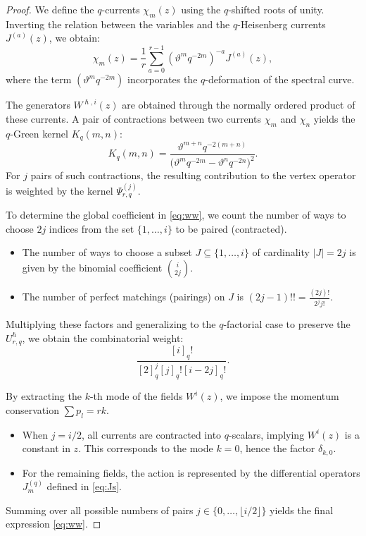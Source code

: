 \documentclass[reqno,11pt]{amsart}
\theoremstyle{plain}
\theoremstyle{definition}
\theoremstyle{remark}
\numberwithin{equation}{section}
\renewcommand{\theta}{\vartheta}
\newcommand{\1}{\mathds{1}}
\newcommand{\2}{\frac{1}{2}}
\begin{document}
{\begin{proof}
					{We define the $q$-currents $\chi_m(z)$ using the $q$-shifted roots of unity. Inverting the relation between the variables and the $q$-Heisenberg currents $J^{(a)}(z)$, we obtain:
						\begin{equation}
							\chi_m(z) = \frac{1}{r} \sum_{a=0}^{r-1} (\theta^m q^{-2m})^{-a} J^{(a)}(z),
						\end{equation}
						where the term $(\theta^m q^{-2m})$ incorporates the $q$-deformation of the spectral curve.}
					
					{The generators $W^{\hslash,i}(z)$ are obtained through the normally ordered product of these currents. A pair of contractions between two currents $\chi_{m}$ and $\chi_{n}$ yields the $q$-Green kernel ${K}_q(m, n)$:
						\begin{equation}
							{K}_q(m, n) = \frac{\theta^{m+n}q^{-2(m+n)}}{\big(\theta^{m}q^{-2m}-\theta^{n}q^{-2n}\big)^2}.
						\end{equation} 
						For $j$ pairs of such contractions, the resulting contribution to the vertex operator is weighted by the kernel $\Psi^{(j)}_{r,q}$.}
					
					{To determine the global coefficient in \eqref{eq:ww}, we count the number of ways to choose $2j$ indices from the set $\{1, \dots, i\}$ to be paired (contracted). 
						\begin{itemize}
							\item The number of ways to choose a subset $J \subseteq \{1, \dots, i\}$ of cardinality $|J|=2j$ is given by the binomial coefficient $\binom{i}{2j}$.
							\item The number of perfect matchings (pairings) on $J$ is $(2j-1)!! = \frac{(2j)!}{2^j j!}$.
						\end{itemize}
						Multiplying these factors and generalizing to the $q$-factorial case to preserve the $U^\hslash_{r,q}$, we obtain the combinatorial weight:
						\begin{equation}
							\frac{[i]_q!}{[2]_q^j [j]_q! [i-2j]_q!}.
					\end{equation}}
					
					{By extracting the $k$-th mode of the fields $W^i(z)$, we impose the momentum conservation $\sum p_l = rk$. 
						\begin{itemize}
							\item When $j = i/2$, all currents are contracted into $q$-scalars, implying $W^i(z)$ is a constant in $z$. This corresponds to the mode $k=0$, hence the factor $\delta_{k,0}$.
							\item For the remaining fields, the action is represented by the differential operators $J^{(q)}_m$ defined in \eqref{eq:Js}.
						\end{itemize}
						Summing over all possible numbers of pairs $j \in \{0, \dots, \lfloor i/2 \rfloor\}$ yields the final expression \eqref{eq:ww}.
					}
				\end{proof}
				
}
\end{document}

